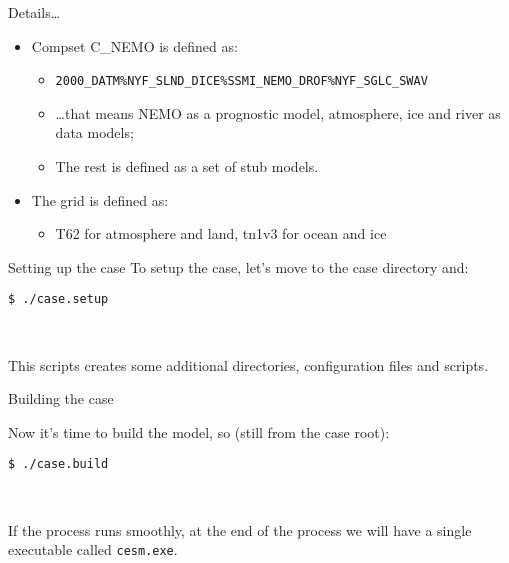 
\begin{frame}{Details\dots}

\begin{itemize}
    \item<1-> Compset C\_NEMO is defined as:
    \begin{itemize}
        \item \texttt{2000\_DATM\%NYF\_SLND\_DICE\%SSMI\_NEMO\_DROF\%NYF\_SGLC\_SWAV}
        \item \dots that means NEMO as a prognostic model, atmosphere, ice and river as data models;
        \item The rest is defined as a set of stub models.
    \end{itemize}
    \item<2-> The grid is defined as:
    \begin{itemize}
        \item T62 for atmosphere and land, tn1v3 for ocean and ice
    \end{itemize}
\end{itemize}
    
\end{frame}



\begin{frame}[fragile]{Setting up the case}
To setup the case, let's move to the case directory and:

\begin{verbatim}
$ ./case.setup
\end{verbatim}

\ 

This scripts creates some additional directories, configuration files and scripts.

\end{frame}



\begin{frame}[fragile]{Building the case}

Now it's time to build the model, so (still from the case root):

\begin{verbatim}
$ ./case.build
\end{verbatim}

\ 

If the process runs smoothly, at the end of the process we will have a single executable called \texttt{cesm.exe}.

\end{frame}



